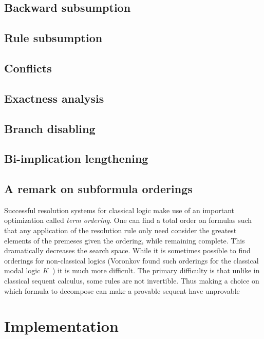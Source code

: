 \subsection{Backward subsumption}

\subsection{Rule subsumption}

\subsection{Conflicts}

\subsection{Exactness analysis}

\subsection{Branch disabling}

\subsection{Bi-implication lengthening}

\subsection{A remark on subformula orderings}

Successful resolution systems for classical logic make use of an important
optimization called \emph{term ordering}.  One can find a total order on
formulas such that any application of the resolution rule only need consider the
greatest elements of the premeses given the ordering, while remaining
complete.  This dramatically decreases the search space.  While it is
sometimes possible to find
orderings for non-classical logics
(Voronkov found such orderings for the classical modal logic
$K$~\cite{Voronkov.2000.LICS}) it is much more difficult.  The primary
difficulty is that unlike in classical sequent calculus, some rules
are not invertible.  Thus making a choice on which formula to
decompose can make a provable sequent have unprovable

\section{Implementation}\label{prop.sec.imogen}

